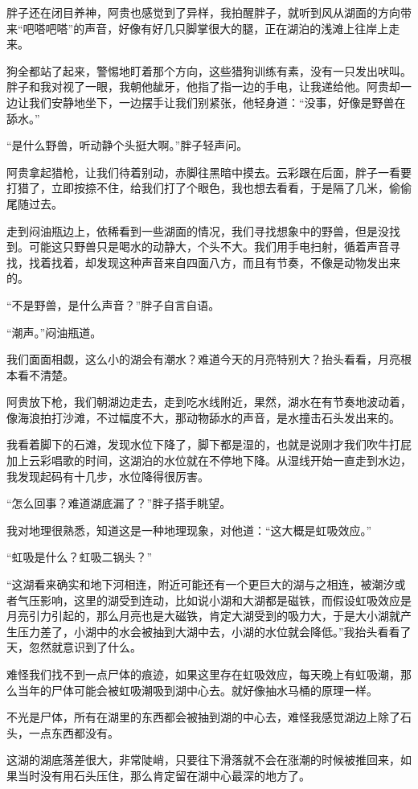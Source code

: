 胖子还在闭目养神，阿贵也感觉到了异样，我拍醒胖子，就听到风从湖面的方向带来“吧嗒吧嗒”的声音，好像有好几只脚掌很大的腿，正在湖泊的浅滩上往岸上走来。

狗全都站了起来，警惕地盯着那个方向，这些猎狗训练有素，没有一只发出吠叫。胖子和我对视了一眼，我朝他龇牙，他指了指一边的手电，让我递给他。阿贵却一边让我们安静地坐下，一边摆手让我们别紧张，他轻身道：“没事，好像是野兽在舔水。”

“是什么野兽，听动静个头挺大啊。”胖子轻声问。

阿贵拿起猎枪，让我们待着别动，赤脚往黑暗中摸去。云彩跟在后面，胖子一看要打猎了，立即按捺不住，给我们打了个眼色，我也想去看看，于是隔了几米，偷偷尾随过去。

走到闷油瓶边上，依稀看到一些湖面的情况，我们寻找想象中的野兽，但是没找到。可能这只野兽只是喝水的动静大，个头不大。我们用手电扫射，循着声音寻找，找着找着，却发现这种声音来自四面八方，而且有节奏，不像是动物发出来的。

“不是野兽，是什么声音？”胖子自言自语。

“潮声。”闷油瓶道。

我们面面相觑，这么小的湖会有潮水？难道今天的月亮特别大？抬头看看，月亮根本看不清楚。

阿贵放下枪，我们朝湖边走去，走到吃水线附近，果然，湖水在有节奏地波动着，像海浪拍打沙滩，不过幅度不大，那动物舔水的声音，是水撞击石头发出来的。

我看着脚下的石滩，发现水位下降了，脚下都是湿的，也就是说刚才我们吹牛打屁加上云彩唱歌的时间，这湖泊的水位就在不停地下降。从湿线开始一直走到水边，我发现起码有十几步，水位降得很厉害。

“怎么回事？难道湖底漏了？”胖子搭手眺望。

我对地理很熟悉，知道这是一种地理现象，对他道：“这大概是虹吸效应。”

“虹吸是什么？虹吸二锅头？”

“这湖看来确实和地下河相连，附近可能还有一个更巨大的湖与之相连，被潮汐或者气压影响，这里的湖受到连动，比如说小湖和大湖都是磁铁，而假设虹吸效应是月亮引力引起的，那么月亮也是大磁铁，肯定大湖受到的吸力大，于是大小湖就产生压力差了，小湖中的水会被抽到大湖中去，小湖的水位就会降低。”我抬头看看了天，忽然就意识到了什么。

难怪我们找不到一点尸体的痕迹，如果这里存在虹吸效应，每天晚上有虹吸潮，那么当年的尸体可能会被虹吸潮吸到湖中心去。就好像抽水马桶的原理一样。

不光是尸体，所有在湖里的东西都会被抽到湖的中心去，难怪我感觉湖边上除了石头，一点东西都没有。

这湖的湖底落差很大，非常陡峭，只要往下滑落就不会在涨潮的时候被推回来，如果当时没有用石头压住，那么肯定留在湖中心最深的地方了。

